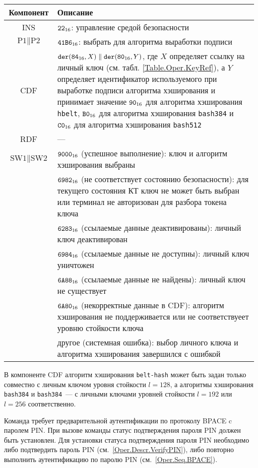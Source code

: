 \noindent
\begin{tabular}{|c|p{14cm}|}
\hline
Компонент & Описание \\
\hline
\hline
INS & $\texttt{22}_{16}$: управление средой безопасности\\ 
\hline
$\text{P1} \parallel\text{P2}$ & $\texttt{41B6}_{16}$: 
выбрать для алгоритма выработки подписи \\
\hline
CDF & 
$\texttt{der}(\texttt{84}_{16}, X) \parallel \texttt{der}(\texttt{80}_{16}, Y)$, 
где $X$ определяет ссылку на личный ключ (см. табл. \ref{Table.Oper.KeyRef}), 
а $Y$ определяет идентификатор используемого при выработке
подписи алгоритма хэширования и
принимает значение $\texttt{90}_{16}$ для алгоритма хэширования \texttt{hbelt},  
$\texttt{B0}_{16}$ для алгоритма хэширования \texttt{bash384} и 
$\texttt{C0}_{16}$ для алгоритма хэширования \texttt{bash512}\\
\hline \hline
RDF &  --- \\
\hline
$\text{SW1} \parallel \text{SW2}$ & 
$\texttt{9000}_{16}$ (успешное выполнение): ключ и алгоритм хэширования
выбраны \\
 & $\texttt{6982}_{16}$ (не соответствует состоянию безопасности): 
для текущего состояния КТ ключ не может быть выбран или
терминал не авторизован для разбора токена ключа\\
 & $\texttt{6283}_{16}$ (ссылаемые данные деактивированы): личный ключ деактивирован\\
 & $\texttt{6984}_{16}$ (ссылаемые данные не доступны): личный ключ уничтожен\\
 & $\texttt{6A88}_{16}$ (ссылаемые данные не найдены): личный ключ не существует\\
 & $\texttt{6A80}_{16}$ (некорректные данные в CDF): алгоритм хэширования
не поддерживается или не соответствуеет уровню стойкости ключа \\
 & другое (системная ошибка): выбор личного ключа и алгоритма
хэширования завершился с ошибкой  \\
\hline
\end{tabular}

В компоненте CDF алгоритм хэширования \texttt{belt-hash}
может быть задан только совместно с личным ключом 
уровня стойкости $l=128$,
а алгоритмы хэширования \texttt{bash384} и \texttt{bash384}~--- 
с личными ключами уровней стойкости $l=192$ или $l=256$
соответственно.

Команда требует предварительной аутентификации по 
протоколу BPACE c паролем PIN. 
При вызове команды статус подтверждения 
пароля PIN должен быть установлен.
Для установки статуса подтверждения пароля PIN 
необходимо либо подтвердить пароль PIN (см.~\ref{Oper.Descr.VerifyPIN}), 
либо повторно выполнить аутентификацию по паролю PIN (см.~\ref{Oper.Seq.BPACE}).

